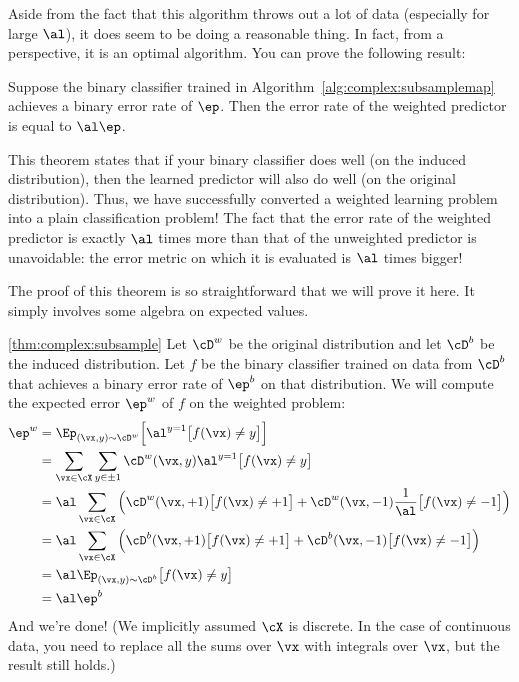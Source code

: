 Aside from the fact that this algorithm throws out a lot of data
(especially for large $\al$), it does seem to be doing a reasonable
thing.  In fact, from a  perspective, it is an
optimal algorithm.  You can prove the following result:

\begin{theorem} \label{thm:complex:subsample}
  Suppose the binary classifier trained in
  Algorithm~\ref{alg:complex:subsamplemap} achieves a binary error
  rate of $\ep$.  Then the error rate of the weighted predictor is
  equal to $\al\ep$.
\end{theorem}

This theorem states that if your binary classifier does well (on the
induced distribution), then the learned predictor will also do well
(on the original distribution).  Thus, we have successfully converted
a weighted learning problem into a plain classification problem!  The
fact that the error rate of the weighted predictor is exactly $\al$
times more than that of the unweighted predictor is unavoidable: the
error metric on which it is evaluated is $\al$ times bigger!


The proof of this theorem is so straightforward that we will prove it
here.  It simply involves some algebra on expected values.

\begin{myproof}{\ref{thm:complex:subsample}}
  Let $\cD^w$ be the original distribution and let $\cD^b$ be the
  induced distribution.  Let $f$ be the binary classifier trained on
  data from $\cD^b$ that achieves a binary error rate of $\ep^b$ on
  that distribution.  We will compute the expected error $\ep^w$ of
  $f$ on the weighted problem:
  \begin{align}
    \ep^w
    &= \Ep_{(\vx,y) \sim \cD^w}
         \Big[ \al^{y=1} \big[f(\vx) \neq y\big] \Big] \\
    &= \sum_{\vx \in \cX} \sum_{y \in \pm 1}
         \cD^w(\vx,y) \al^{y=1} \big[f(\vx) \neq y\big] \\
    &= \al \sum_{\vx \in \cX} \Big(
         \cD^w(\vx,+1) \big[f(\vx) \neq +1\big] +
         \cD^w(\vx,-1) \frac 1 \al \big[f(\vx) \neq -1\big] \Big) \\
    &= \al \sum_{\vx \in \cX} \Big(
         \cD^b(\vx,+1) \big[f(\vx) \neq +1\big] +
         \cD^b(\vx,-1) \big[f(\vx) \neq -1\big] \Big) \\
    &= \al \Ep_{(\vx,y) \sim \cD^b} \big[f(\vx) \neq y\big] \\
    &= \al \ep^b
  \end{align}
And we're done!  (We implicitly assumed $\cX$ is discrete.  In the
case of continuous data, you need to replace all the sums over $\vx$
with integrals over $\vx$, but the result still holds.)
\end{myproof}

